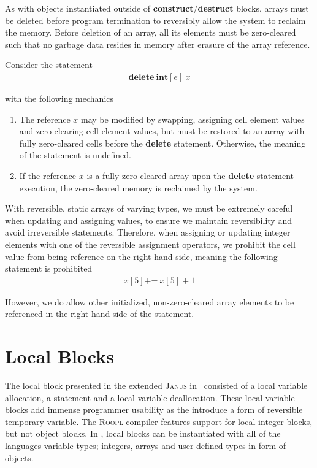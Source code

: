 As with \rooplpp objects instantiated outside of \textbf{construct}/\textbf{destruct} blocks, arrays must be deleted before program termination to reversibly allow the system to reclaim the memory. Before deletion of an array, all its elements must be zero-cleared such that no garbage data resides in memory after erasure of the array reference.

Consider the statement
\begin{align*}
\textbf{delete}\ \textbf{int}[e]\ x
\end{align*}

with the following mechanics

\begin{enumerate}
\item The reference $x$ may be modified by swapping, assigning cell element values and zero-clearing cell element values, but must be restored to an array with fully zero-cleared cells before the \textbf{delete} statement. Otherwise, the meaning of the statement is undefined.
\item If the reference $x$ is a fully zero-cleared array upon the \textbf{delete} statement execution, the zero-cleared memory is reclaimed by the system.
\end{enumerate}

With reversible, static arrays of varying types, we must be extremely careful when updating and assigning values, to ensure we maintain reversibility and avoid irreversible statements. Therefore, when assigning or updating integer elements with one of the reversible assignment operators, we prohibit the cell value from being reference on the right hand side, meaning the following statement is prohibited
\begin{align*}
x[5] \texttt{+=}\ x[5] + 1 
\end{align*}

However, we do allow other initialized, non-zero-cleared array elements to be referenced in the right hand side of the statement.

\section{Local Blocks}
\label{sec:local-blocks}
The local block presented in the extended \textsc{Janus} in~\cite{ty:ejanus} consisted of a local variable allocation, a statement and a local variable deallocation. These local variable blocks add immense programmer usability as the introduce a form of reversible temporary variable. The \textsc{Roopl} compiler features support for local integer blocks, but not object blocks. In \rooplpp, local blocks can be instantiated with all of the languages variable types; integers, arrays and user-defined types in form of objects.

